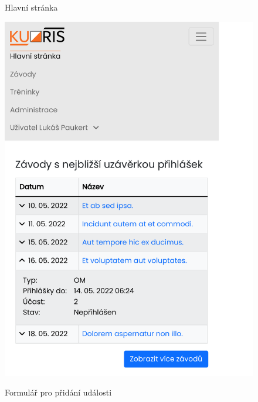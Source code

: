 \begin{figure}[h]
    \centering
    \begin{minipage}[b]{0.48\linewidth}
        \caption{Hlavní stránka}
        \label{figure:homepage-responsive-layout}
        \includegraphics[width=0.99\linewidth, cfbox=kuorisgray 0.5pt 0pt]{images/homepage-responsive-layout.pdf}
    \end{minipage}
    \hfill
    \begin{minipage}[b]{0.48\linewidth}
        \caption{Formulář pro přidání události}
        \label{figure:form-responsive-layout}

\end{minipage}
\end{figure}
